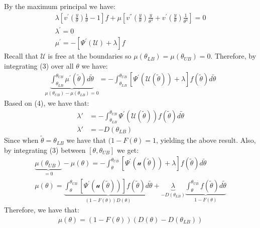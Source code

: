 \documentclass{article}
\begin{document}
\begin{itemize}
\begin{itemize}
        By the maximum principal we have:
        \begin{gather*}
            \lambda [v^{'} (\frac{y}{\theta})\frac{1}{\theta}-1]f + \mu [v^{''}(\frac{y}{\theta})\frac{y}{\theta^{3}} + v^{'}(\frac{y}{\theta})\frac{1}{\theta^{2}}] = 0 \tag{1} \\
            \lambda^{'} = 0 \tag{2} \\
            \mu^{'} = -[\Psi^{'}(\mathcal{U}) + \lambda]f \tag{3}
        \end{gather*}
        Recall that $\mathcal{U}$ is free at the boundaries so $\mu(\theta_{LB}) = \mu(\theta_{UB}) = 0$. Therefore, by integrating (3) over all $\theta$ we have:
        \begin{gather*}
            \underbrace{\int_{\theta_{LB}}^{\theta_{UB}} \mu^{'}(\widetilde{\theta}) d \widetilde{\theta}}_{\mu(\theta_{UB}) - \mu(\theta_{LB}) = 0} = -\int_{\theta_{LB}}^{\theta_{UB}} [\Psi^{'} (\mathcal{U}(\widetilde{\theta})) + \lambda]f(\widetilde{\theta}) d \widetilde{\theta} \tag{4}
        \end{gather*}
        Based on (4), we have that:
        \begin{align*}
            \lambda' &= - \int_{\theta_{LB}}^{\theta_{UB}} \Psi^{'} (\mathcal{U}(\widetilde{\theta}))f(\widetilde{\theta})d \widetilde{\theta} \\
            \lambda' &= -D(\theta_{LB}) \tag{5}
        \end{align*}
        Since when $\widetilde{\theta} = \theta_{LB}$ we have that $(1 - F(\theta) = 1$, yielding the above result. Also, by integrating (3) between $[\theta, \theta_{UB}]$ we get:
        \begin{gather*}
            \underbrace{\mu(\theta_{UB})}_{=0} - \mu(\theta) = - \int_{\theta}^{\theta_{UB}} [\Psi^{'} (\mathcal{u}(\widetilde{\theta})) + \lambda]f (\widetilde{\theta}) d \widetilde{\theta} \\
            \mu(\theta) =  \underbrace{\int_{\theta}^{\theta_{UB}} [\Psi^{'} (\mathcal{u}(\widetilde{\theta}))]f (\widetilde{\theta}) d \widetilde{\theta}}_{(1 - F(\theta))D(\theta)} +  \underbrace{\lambda}_{-D(\theta_{LB})}  \underbrace{\int_{\theta}^{\theta_{UB}} f (\widetilde{\theta}) d \widetilde{\theta}}_{1 - F(\theta)}
        \end{gather*}
        Therefore, we have that:
        \begin{gather*}
            \mu (\theta) = (1-F(\theta)) (D(\theta) - D(\theta_{LB})) \tag{6}
        \end{gather*}

\end{itemize}
\end{itemize}
\end{document}
